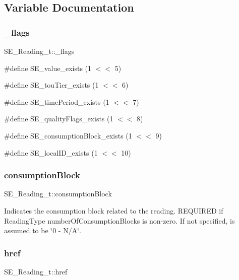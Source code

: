 \subsection{Variable Documentation}
\mbox{\label{group__Reading_gaa7f6de4bc1e39a68c78b5e16db226694}} 
\subsubsection{\texorpdfstring{\+\_\+flags}{\_flags}}
{\footnotesize\ttfamily S\+E\+\_\+\+Reading\+\_\+t\+::\+\_\+flags}

\#define S\+E\+\_\+value\+\_\+exists (1 $<$$<$ 5)

\#define S\+E\+\_\+tou\+Tier\+\_\+exists (1 $<$$<$ 6)

\#define S\+E\+\_\+time\+Period\+\_\+exists (1 $<$$<$ 7)

\#define S\+E\+\_\+quality\+Flags\+\_\+exists (1 $<$$<$ 8)

\#define S\+E\+\_\+consumption\+Block\+\_\+exists (1 $<$$<$ 9)

\#define S\+E\+\_\+local\+I\+D\+\_\+exists (1 $<$$<$ 10) \mbox{\label{group__Reading_ga23b7fc58868416c4249ac364750c8884}} 
\subsubsection{\texorpdfstring{consumption\+Block}{consumptionBlock}}
{\footnotesize\ttfamily S\+E\+\_\+\+Reading\+\_\+t\+::consumption\+Block}

Indicates the consumption block related to the reading. R\+E\+Q\+U\+I\+R\+ED if Reading\+Type number\+Of\+Consumption\+Blocks is non-\/zero. If not specified, is assumed to be \char`\"{}0 -\/ N/\+A\char`\"{}. \mbox{\label{group__Reading_ga95c214b9b296909170e1426a83adcd63}} 
\subsubsection{\texorpdfstring{href}{href}}
{\footnotesize\ttfamily S\+E\+\_\+\+Reading\+\_\+t\+::href}

